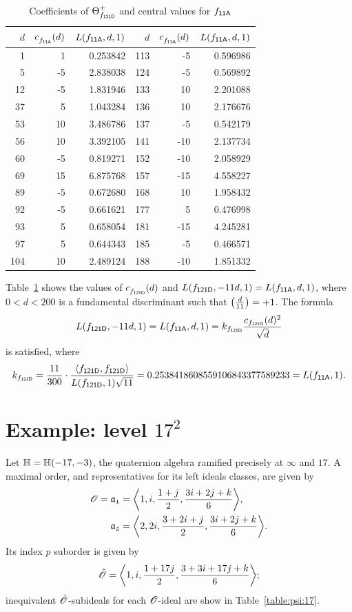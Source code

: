 \begin{table}
\begin{tabular}{||r|rr||r|rr||}
\hline
$d$ & $c^{}_{f_\mathsf{{11A}}}(d)$ & $L(f_\mathsf{{11A}},d,1)$& $d$ & $c^{}_{f_\mathsf{{11A}}}(d)$ & $L(f_\mathsf{{11A}},d,1)$\\
\hline
   1 & 1 & 0.253842 & 113 & -5 & 0.596986 \\
   5 & -5 & 2.838038 & 124 & -5 & 0.569892 \\
   12 & -5 & 1.831946 & 133 & 10 & 2.201088 \\
   37 & 5 & 1.043284 & 136 & 10 & 2.176676 \\
   53 & 10 & 3.486786 & 137 & -5 & 0.542179 \\
   56 & 10 & 3.392105 & 141 & -10 & 2.137734 \\
   60 & -5 & 0.819271 & 152 & -10 & 2.058929 \\
   69 & 15 & 6.875768 & 157 & -15 & 4.558227 \\
   89 & -5 & 0.672680 & 168 & 10 & 1.958432 \\
   92 & -5 & 0.661621 & 177 & 5 & 0.476998 \\
   93 & 5 & 0.658054 & 181 & -15 & 4.245281 \\
   97 & 5 & 0.644343 & 185 & -5 & 0.466571 \\
   104 & 10 & 2.489124 & 188 & -10 & 1.851332 \\
\hline
\end{tabular}
\caption{Coefficients of ${\Theta}^+_{f_\mathsf{{121D}}}$ and central values for $f_\mathsf{{11A}}$
          \label{table:dlcs:121D+}}
\end{table}
Table~\ref{table:dlcs:121D+} shows
the values of $c^{}_{f_\mathsf{{121D}}}(d)$
and $L(f_\mathsf{{121D}},-11d,1) = L(f_\mathsf{{11A}},d,1)$,
where $0<d<200$ is a fundamental discriminant
such that
$\kro{d}{11}=+1$.
The formula
\[
  L(f_\mathsf{{121D}},-11d,1) = L(f_\mathsf{{11A}},d,1)
  = k_{f_\mathsf{{121D}}} \frac{c_{f_\mathsf{{121D}}}(d)^2}{\sqrt{d}}
\]
is satisfied, where 
\[
  k_{\mf{121D}} = \frac{11}{300}\cdot
  \frac{\<\mf{121D},\mf{121D}>}
        {L(\mf{121D},1)\sqrt{11}}
  = 0.2538418608559106843377589233  = L(\mf{11A},1).
\]
\section{Example: level $17^2$}
Let ${\mathbb{H}}={\mathbb{H}}(-17,-3)$,
the quaternion algebra ramified precisely at $\infty$ and $17$.
A maximal order,
and representatives for its left ideals classes, are given by
\begin{align*}
   \O=\id{a_{1}}&=\<1,i,\frac{1+j}{2},\frac{3i+2j+k}{6}>, \\
     \id{a_{2}}&=\<2,2i,\frac{3+2i+j}{2},\frac{3i+2j+k}{6}>. \\
\end{align*}
Its index $p$ suborder is given by
\[
  \Ot = \<1,i,\frac{1+17j}{2},\frac{3+3i+17j+k}{6}>;
\]
inequivalent ${\tilde{{\mathscr{O}}}}$-subideals for each ${\mathscr{O}}$-ideal are show in
Table~\ref{table:psi:17}.

